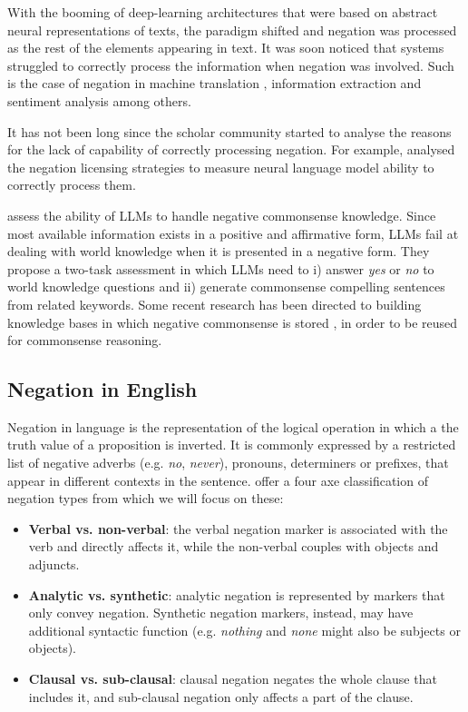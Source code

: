 \documentclass[11pt]{article}
\begin{document}
With the booming of deep-learning architectures that were based on abstract neural representations of texts, the paradigm shifted and negation was processed as the rest of the elements appearing in text. It was soon noticed that systems struggled to correctly process the information when negation was involved. Such is the case of negation in machine translation \cite{bentivogli-etal-2016-neural,tang-etal-2021-revisiting}, information extraction \cite{grivas-etal-2020-cute} and sentiment analysis \cite{barnes_velldal_øvrelid_2021} among others.

It has not been long since the scholar community started to analyse the reasons for the lack of capability of correctly processing negation. For example, \citet{jumelet-hupkes-2018-language} analysed the negation licensing strategies to measure neural language model ability to correctly process them.

\citet{chen2023say} assess the ability of LLMs to handle negative commonsense knowledge. Since most available information exists in a positive and affirmative form, LLMs fail at dealing with world knowledge when it is presented in a negative form. They propose a two-task assessment in which LLMs need to i) answer \textit{yes} or \textit{no} to world knowledge questions and ii) generate commonsense compelling sentences from related keywords. Some recent research has been directed to building knowledge bases in which negative commonsense is stored \citep{Arnaout2022}, in order to be reused for commonsense reasoning.

\subsection{Negation in English}

Negation in language is the representation of the logical operation in which a the truth value of a proposition is inverted. It is commonly expressed by a restricted list of negative adverbs (e.g. \textit{no}, \textit{never}), pronouns, determiners or prefixes, that appear in different contexts in the sentence. \citet{pullum2002} offer a four axe classification of negation types from which we will focus on these:
\begin{itemize}
    \item \textbf{Verbal vs. non-verbal}: the verbal negation marker is associated with the verb and directly affects it, while the non-verbal couples with objects and adjuncts.
    \item \textbf{Analytic vs. synthetic}: analytic negation is represented by markers that only convey negation. Synthetic negation markers, instead, may have additional syntactic function (e.g. \textit{nothing} and \textit{none} might also be subjects or objects).
    \item \textbf{Clausal vs. sub-clausal}: clausal negation negates the whole clause that includes it, and sub-clausal negation only affects a part of the clause.
\end{itemize}
\end{document}
